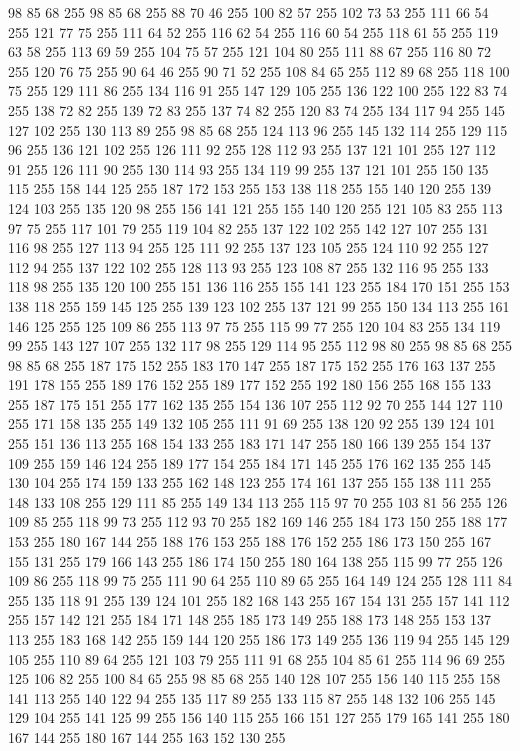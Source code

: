 98 85 68 255 98 85 68 255 88 70 46 255 100 82 57 255 102 73 53 255 111 66 54 255 121 77 75 255 111 64 52 255 116 62 54 255 116 60 54 255 118 61 55 255 119 63 58 255 113 69 59 255 104 75 57 255 121 104 80 255 111 88 67 255 116 80 72 255 120 76 75 255 90 64 46 255 90 71 52 255 108 84 65 255 112 89 68 255 118 100 75 255 129 111 86 255 134 116 91 255 147 129 105 255 136 122 100 255 122 83 74 255 138 72 82 255 139 72 83 255 137 74 82 255 120 83 74 255 134 117 94 255 145 127 102 255 130 113 89 255 98 85 68 255 124 113 96 255 145 132 114 255 129 115 96 255 136 121 102 255 126 111 92 255 128 112 93 255 137 121 101 255 127 112 91 255 126 111 90 255 130 114 93 255 134 119 99 255 137 121 101 255 150 135 115 255 158 144 125 255 187 172 153 255 153 138 118 255 155 140 120 255 139 124 103 255 135 120 98 255 156 141 121 255 155 140 120 255 121 105 83 255 113 97 75 255 117 101 79 255 119 104 82 255 137 122 102 255 142 127 107 255 131 116 98 255
127 113 94 255 125 111 92 255 137 123 105 255 124 110 92 255 127 112 94 255 137 122 102 255 128 113 93 255 123 108 87 255 132 116 95 255 133 118 98 255 135 120 100 255 151 136 116 255 155 141 123 255 184 170 151 255 153 138 118 255 159 145 125 255 139 123 102 255 137 121 99 255 150 134 113 255 161 146 125 255 125 109 86 255 113 97 75 255 115 99 77 255 120 104 83 255 134 119 99 255 143 127 107 255 132 117 98 255 129 114 95 255 112 98 80 255 98 85 68 255 98 85 68 255 187 175 152 255 183 170 147 255 187 175 152 255 176 163 137 255 191 178 155 255 189 176 152 255 189 177 152 255 192 180 156 255 168 155 133 255 187 175 151 255 177 162 135 255 154 136 107 255 112 92 70 255 144 127 110 255 171 158 135 255 149 132 105 255 111 91 69 255 138 120 92 255 139 124 101 255 151 136 113 255 168 154 133 255 183 171 147 255 180 166 139 255 154 137 109 255 159 146 124 255 189 177 154 255 184 171 145 255 176 162 135 255 145 130 104 255 174 159 133 255 162 148 123 255 174 161 137 255 155 138 111 255
148 133 108 255 129 111 85 255 149 134 113 255 115 97 70 255 103 81 56 255 126 109 85 255 118 99 73 255 112 93 70 255 182 169 146 255 184 173 150 255 188 177 153 255 180 167 144 255 188 176 153 255 188 176 152 255 186 173 150 255 167 155 131 255 179 166 143 255 186 174 150 255 180 164 138 255 115 99 77 255 126 109 86 255 118 99 75 255 111 90 64 255 110 89 65 255 164 149 124 255 128 111 84 255 135 118 91 255 139 124 101 255 182 168 143 255 167 154 131 255 157 141 112 255 157 142 121 255 184 171 148 255 185 173 149 255 188 173 148 255 153 137 113 255 183 168 142 255 159 144 120 255 186 173 149 255 136 119 94 255 145 129 105 255 110 89 64 255 121 103 79 255 111 91 68 255 104 85 61 255 114 96 69 255 125 106 82 255 100 84 65 255 98 85 68 255 140 128 107 255 156 140 115 255 158 141 113 255 140 122 94 255 135 117 89 255 133 115 87 255 148 132 106 255 145 129 104 255 141 125 99 255 156 140 115 255 166 151 127 255 179 165 141 255 180 167 144 255 180 167 144 255 163 152 130 255
